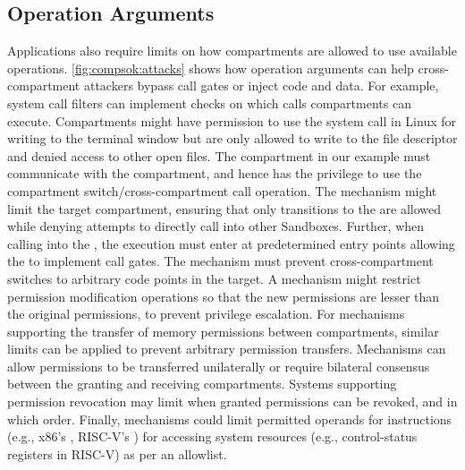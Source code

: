 \subsection{Operation Arguments}
Applications also require limits on how compartments are allowed to use
available operations.
\autoref{fig:compsok:attacks} shows how operation arguments can
help cross-compartment attackers bypass call gates or inject code
and data.
For example, system call filters can implement checks on which calls 
compartments can execute.
Compartments might have permission to use the 
system call in Linux for writing to the terminal window but are only 
allowed to write to the  file descriptor and 
denied access to other open files.
The \sandbox compartment in our example \browser must communicate with the
\renderer compartment, and hence has the privilege to use the 
compartment switch/cross-compartment call operation.
The mechanism might limit the target compartment, ensuring that only 
transitions to the \renderer are allowed while denying attempts to
directly call into other Sandboxes.
Further, when calling into the \renderer, the execution must enter at
predetermined entry points allowing the \renderer to implement call gates.
The mechanism must prevent cross-compartment switches to arbitrary
code points in the target.
A mechanism might restrict permission modification operations so that the
new permissions are lesser than the original permissions, to prevent
privilege escalation.
For mechanisms supporting the transfer of memory permissions between compartments,
similar limits can be applied to prevent arbitrary permission transfers.
Mechanisms can allow permissions to be transferred unilaterally or require
bilateral consensus between the granting and receiving compartments.
Systems supporting permission revocation may limit when granted permissions
can be revoked, and in which order.
Finally, mechanisms could limit permitted operands for
instructions (e.g., x86's , RISC-V's ) for
accessing system resources (e.g., control-status registers in RISC-V)
as per an allowlist.

